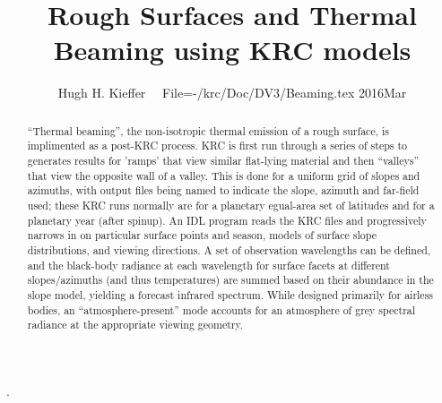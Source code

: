 \documentclass{article}
\title{Rough Surfaces and Thermal Beaming using KRC models}
\author{Hugh H. Kieffer  \ \ File=-/krc/Doc/DV3/Beaming.tex  2016Mar}
\begin{document}
\maketitle 
\setlength{\baselineskip}{8.pt} 
\tableofcontents
\listoffigures
\listoftables
\setlength{\baselineskip}{12.pt} 
\hrulefill .\hrulefill

\begin{abstract}
``Thermal beaming'', the non-isotropic thermal emission of a rough surface, is
  implimented as a post-KRC process.  KRC is first run through a series of steps
  to generates results for 'ramps' that view similar flat-lying material and
  then ``valleys'' that view the opposite wall of a valley. This is done for a
  uniform grid of slopes and azimuths, with output files being named to indicate
  the slope, azimuth and far-field used; these KRC runs normally are for a
  planetary egual-area set of latitudes and for a planetary year (after spinup). An IDL
  program reads the KRC files and progressively narrows in on particular surface
  points and season, models of surface slope distributions, and viewing
  directions. A set of observation wavelengths can be defined, and the
  black-body radiance at each wavelength for surface facets at different
  slopes/azimuths (and thus temperatures) are summed based on their abundance in
  the slope model, yielding a forecast infrared spectrum. While designed
  primarily for airless bodies, an ``atmosphere-present'' mode accounts for an
  atmosphere of grey spectral radiance at the appropriate viewing geometry.
\end{abstract}
\end{document}
